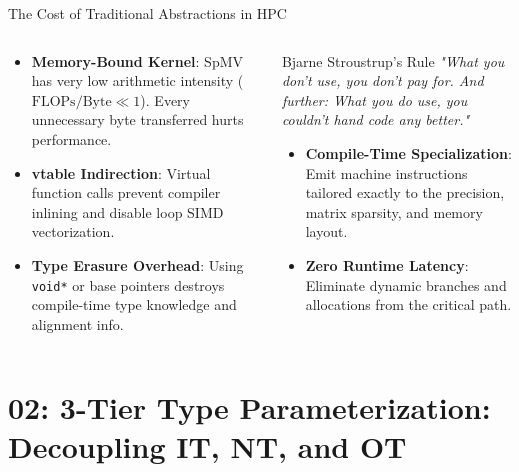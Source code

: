 \documentclass[aspectratio=169,10pt]{beamer}
\newcommand{\keyterm}[1]{\textcolor{Accent}{\bfseries #1}}
\newcommand{\sectionfoot}[1]{\gdef\insertsectionhead{#1}}
\newcommand{\subhead}[1]{%
  \medskip{\large\bfseries\textcolor{Accent}{#1}\par}%
  \vspace{-0.18cm}{\color{Accent}\rule{0.88\linewidth}{1.2pt}\par}\smallskip}
\begin{document}
\begin{frame}[fragile]{The Cost of Traditional Abstractions in HPC}
  \begin{columns}[T,onlytextwidth]
    \begin{column}{0.48\textwidth}
      \subhead{Why OO Polymorphism Fails in Sparse HPC}
      \begin{itemize}\setlength{\itemsep}{0.45em}
        \item \keyterm{Memory-Bound Kernel}: SpMV has very low arithmetic intensity ($\text{FLOPs/Byte} \ll 1$). Every unnecessary byte transferred hurts performance.
        \item \keyterm{vtable Indirection}: Virtual function calls prevent compiler inlining and disable loop SIMD vectorization.
        \item \keyterm{Type Erasure Overhead}: Using \texttt{void*} or base pointers destroys compile-time type knowledge and alignment info.
      \end{itemize}
    \end{column}
    \begin{column}{0.48\textwidth}
      \subhead{The C++ Zero-Overhead Promise}
      \begin{block}{\large Bjarne Stroustrup's Rule}
        \textit{"What you don't use, you don't pay for. And further: What you do use, you couldn't hand code any better."}
      \end{block}
      \vspace{0.5em}
      \begin{itemize}\setlength{\itemsep}{0.4em}
        \item \textbf{Compile-Time Specialization}: Emit machine instructions tailored exactly to the precision, matrix sparsity, and memory layout.
        \item \textbf{Zero Runtime Latency}: Eliminate dynamic branches and allocations from the critical path.
      \end{itemize}
    \end{column}
  \end{columns}
\end{frame}

\section{02: 3-Tier Type Parameterization: Decoupling IT, NT, and OT}
\sectionfoot{02: 3-Tier Type Parameterization}
\end{document}
